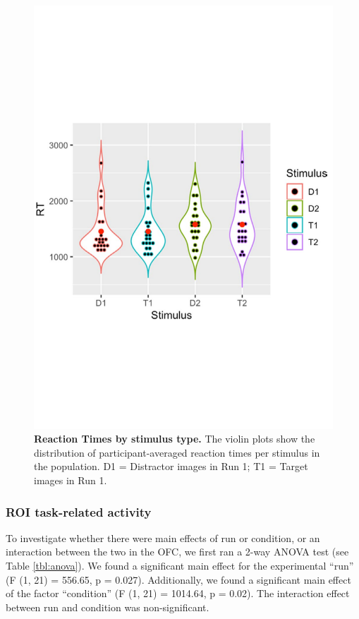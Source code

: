 \begin{figure}[h]
\centering\includegraphics[width=0.7\linewidth]{images/Ch4/Figure4_Violin.pdf}
\caption{\textbf{Reaction Times by stimulus type.  }   The violin plots show the distribution of participant-averaged reaction times per stimulus in the population. D1 = Distractor images in Run 1; T1 = Target images in Run 1.}  \label{fig:Fig4}
\end{figure}






\subsubsection{ROI task-related activity}
To investigate whether there were main effects of run or condition, or an interaction between the two in the OFC, we first ran a 2-way ANOVA test (see Table \ref{tbl:anova}).  We found a significant main effect for the experimental “run” (F (1, 21) = 556.65, p = 0.027). Additionally, we found a significant main effect of the factor “condition” (F (1, 21) = 1014.64, p = 0.02). The interaction effect between run and condition was non-significant. 

